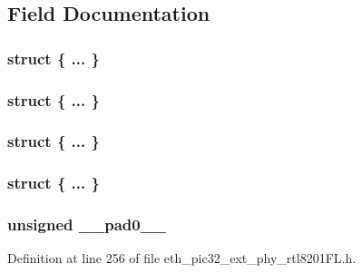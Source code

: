 \subsection{Field Documentation}
\hypertarget{union_____a_n_e_x_pbits__t_aca5dc977880abb5ecc9d307403d72b72}{}\subsubsection[{"@128}]{\setlength{\rightskip}{0pt plus 5cm}struct \{ ... \} }\label{union_____a_n_e_x_pbits__t_aca5dc977880abb5ecc9d307403d72b72}
\hypertarget{union_____a_n_e_x_pbits__t_a2b1638b2c577f3c1e6619477bb8e2b41}{}\subsubsection[{"@130}]{\setlength{\rightskip}{0pt plus 5cm}struct \{ ... \} }\label{union_____a_n_e_x_pbits__t_a2b1638b2c577f3c1e6619477bb8e2b41}
\hypertarget{union_____a_n_e_x_pbits__t_a3368c74fe7accb896e6c55943a5c8faf}{}\subsubsection[{"@200}]{\setlength{\rightskip}{0pt plus 5cm}struct \{ ... \} }\label{union_____a_n_e_x_pbits__t_a3368c74fe7accb896e6c55943a5c8faf}
\hypertarget{union_____a_n_e_x_pbits__t_a5c3c9d4b980d6e2af4c48bd5b2b8c2cf}{}\subsubsection[{"@202}]{\setlength{\rightskip}{0pt plus 5cm}struct \{ ... \} }\label{union_____a_n_e_x_pbits__t_a5c3c9d4b980d6e2af4c48bd5b2b8c2cf}
\hypertarget{union_____a_n_e_x_pbits__t_adf71f3d8410c1f1dbbc96680a92c49af}{}
\subsubsection[{\+\_\+\+\_\+pad0\+\_\+\+\_\+}]{\setlength{\rightskip}{0pt plus 5cm}unsigned \+\_\+\+\_\+pad0\+\_\+\+\_\+}\label{union_____a_n_e_x_pbits__t_adf71f3d8410c1f1dbbc96680a92c49af}


Definition at line 256 of file eth\+\_\+pic32\+\_\+ext\+\_\+phy\+\_\+rtl8201\+F\+L.\+h.

